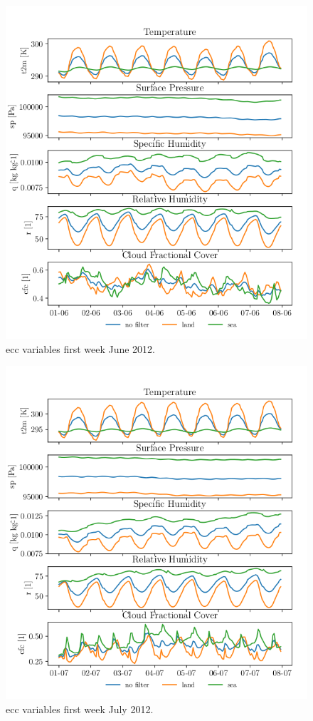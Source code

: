 \begin{figure}[ht]
    \centering
    \includegraphics{python_figs/spatially_averaged_one_week_from_2012-06-01.png}
    \caption{\acrshort{ecc} variables first week June 2012.}
    \label{fig:jun12}
\end{figure}
\begin{figure}[ht]
    \centering
    \includegraphics{python_figs/spatially_averaged_one_week_from_2012-07-01.png}
    \caption{\acrshort{ecc} variables first week July 2012.}
    \label{fig:jul12}
\end{figure}
